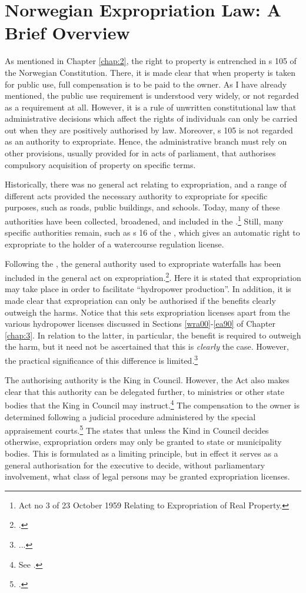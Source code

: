 \section{Norwegian Expropriation Law: A Brief Overview}

As mentioned in Chapter \ref{chap:2}, the right to property is entrenched in s 105 of the Norwegian Constitution. There, it is made clear that when property is taken for public use, full compensation is to be paid to the owner. As I have already mentioned, the public use requirement is understood very widely, or not regarded as a requirement at all. However, it is a rule of unwritten constitutional law that administrative decisions which affect the rights of individuals can only be carried out when they are positively authorised by law. Moreover, s 105 is not regarded as an authority to expropriate. Hence, the administrative branch must rely on other provisions, usually provided for in acts of parliament, that authorises compulsory acquisition of property on specific terms.  

Historically, there was no general act relating to expropriation, and a range of different acts provided the necessary authority to expropriate for specific purposes, such as roads, public buildings, and schools. Today, many of these authorities have been collected, broadened, and included in the \cite{ea59}.\footnote{Act no 3 of 23 October 1959 Relating to Expropriation of Real Property.} Still, many specific authorities remain, such as s 16 of the \cite{wra17}, which gives an automatic right to expropriate to the holder of a watercourse regulation license.

Following the \cite{wra00}, the general authority used to expropriate waterfalls has been included in the general act on expropriation.\footcite[2 no 51]{ea59}. Here it is stated that expropriation may take place in order to facilitate ``hydropower production''. In addition, it is made clear that expropriation can only be authorised if the benefits clearly outweigh the harms.  Notice that this sets expropriation licenses apart from the various hydropower licenses discussed in Sections \ref{wra00}-\ref{ea90} of Chapter \ref{chap:3}. In relation to the latter, in particular, the benefit is required to outweigh the harm, but it need not be ascertained that this is {\it clearly} the case. However, the practical significance of this difference is limited.\footnote{...}

The authorising authority is the King in Council. However, the Act also makes clear that this authority can be delegated further, to ministries or other state bodies that the King in Council may instruct.\footnote{See \cite[5]{ea59}.} The compensation to the owner is determined following a judicial procedure administered by the special  appraisement courts.\footnote{\cite[2]{ea59}.} 
The \cite{ea59} states that unless the Kind in Council decides otherwise, expropriation orders may only be granted to state or municipality bodies. This is formulated as a limiting principle, but in effect it serves as a general authorisation for the executive to decide, without parliamentary involvement, what class of legal persons may be granted expropriation licenses. 

